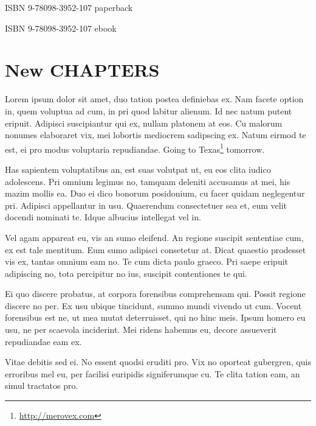 \documentclass[11pt,]{book}
\DeclareRobustCommand{\href}[2]{#2\footnote{\url{#1}}}
\begin{document}
        \par\noindent ISBN 9-78098-3952-107 paperback
        \par\noindent ISBN 9-78098-3952-107 ebook
    \newline

    \par\noindent 
    \vspace*{\fill}
  \clearpage

  
{
\setcounter{tocdepth}{1}
\tableofcontents
}
\newpage
\pagestyle{fancy}
\hypertarget{new-chapters}{%
\chapter{New CHAPTERS}\label{new-chapters}}

Lorem ipsum dolor sit amet, duo tation postea definiebas ex. Nam facete
option in, quem voluptua ad cum, in pri quod labitur alienum. Id nec
natum putent eripuit. Adipisci suscipiantur qui ex, nullam platonem at
eos. Cu malorum nonumes elaboraret vix, mei lobortis mediocrem
sadipscing ex. Natum eirmod te est, ei pro modus voluptaria repudiandae.
Going to \href{http://merovex.com}{Texas} tomorrow.

Has sapientem voluptatibus an, est suas volutpat ut, eu eos clita iudico
adolescens. Pri omnium legimus no, tamquam deleniti accusamus at mei,
his mazim mollis ea. Duo ei dico bonorum posidonium, cu facer quidam
neglegentur pri. Adipisci appellantur in usu. Quaerendum consectetuer
sea et, eum velit docendi nominati te. Idque albucius intellegat vel in.

Vel agam appareat eu, vis an sumo eleifend. An regione suscipit
sententiae cum, ex est tale mentitum. Eum sumo adipisci consetetur at.
Dicat quaestio prodesset vis ex, tantas omnium eam no. Te cum dicta
paulo graeco. Pri saepe eripuit adipiscing no, tota percipitur no ius,
suscipit contentiones te qui.

Ei quo discere probatus, at corpora forensibus comprehensam qui. Possit
regione discere no per. Ex usu ubique tincidunt, summo mundi vivendo ut
cum. Vocent forensibus est ne, ut mea mutat deterruisset, qui no hinc
meis. Ipsum homero eu usu, ne per scaevola inciderint. Mei ridens
habemus eu, decore assueverit repudiandae eam ex.

Vitae debitis sed ei. No essent quodsi eruditi pro. Vix no oporteat
gubergren, quis erroribus mel eu, per facilisi euripidis signiferumque
cu. Te clita tation eam, an simul tractatos pro.
\end{document}
